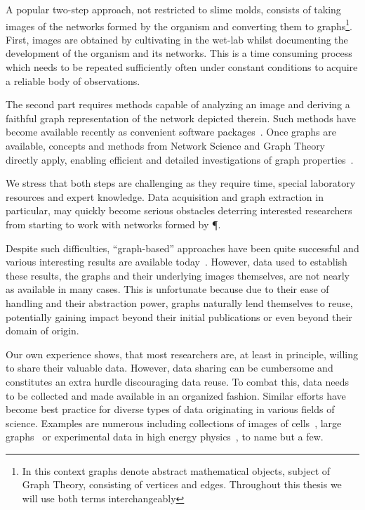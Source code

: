  	A popular two-step approach, not restricted to slime molds, consists of taking images of the networks formed by the organism and converting them to graphs\footnote{In this context graphs denote abstract mathematical objects, subject of Graph Theory, consisting of vertices and edges. Throughout this thesis we will use both terms interchangeably}. First, images are obtained by cultivating \Pp in the wet-lab whilst documenting the development of the organism and its networks. This is a time consuming process which needs to be repeated sufficiently often under constant conditions to acquire a reliable body of observations. 

 	The second part requires methods capable of analyzing an image and deriving a faithful graph representation of the network depicted therein. Such methods have become available recently as convenient software packages~\cite{dirnberger2015nefi}. Once graphs are available, concepts and methods from Network Science and Graph Theory directly apply, enabling efficient and detailed investigations of graph properties~\cite{baumgarten2012computational,heaton2012analysis}.

 	We stress that both steps are challenging as they require time, special laboratory resources and expert knowledge. Data acquisition and graph extraction in particular, may quickly become serious obstacles deterring interested researchers from starting to work with networks formed by \P. 

 	Despite such difficulties, ``graph-based'' approaches have been quite successful and various interesting results are available today~\cite{baumgarten2010plasmodial,baumgarten2013functional,fessel2014analytical,fessel2012Physarum,ito2011characterization}. However, data used to establish these results, \ie the graphs and their underlying images themselves, are not nearly as available in many cases. This is unfortunate because due to their ease of handling and their abstraction power, graphs naturally lend themselves to reuse, potentially gaining impact beyond their initial publications or even beyond their domain of origin.

 	Our own experience shows, that most researchers are, at least in principle, willing to share their valuable data. However, data sharing can be cumbersome and constitutes an extra hurdle discouraging data reuse. To combat this, data needs to be collected and made available in an organized fashion. Similar efforts have become best practice for diverse types of data originating in various fields of science. Examples are numerous including collections of images of cells~\cite{cell}, large graphs~\cite{snap} or experimental data in high energy physics~\cite{hepdata}, to name but a few.

